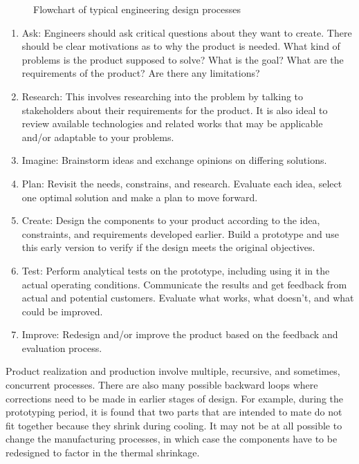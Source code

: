 \documentclass[
10pt,
a4paper,
openany,
svgnames,
]{book}
\begin{document}
\begin{figure}[h]
  \centering
  \caption{Flowchart of typical engineering design processes}
  \label{fig: engineering design processes}
\end{figure}

\begin{enumerate}
\item Ask: Engineers should ask critical questions about they want to create. There should be clear motivations as to why the product is needed. What kind of problems is the product supposed to solve? What is the goal? What are the requirements of the product? Are there any limitations?
\item Research: This involves researching into the problem by talking to stakeholders about their requirements for the product. It is also ideal to review available technologies and related works that may be applicable and/or adaptable to your problems.
\item Imagine: Brainstorm ideas and exchange opinions on differing solutions.
\item Plan: Revisit the needs, constrains, and research. Evaluate each idea, select one optimal solution and make a plan to move forward.
\item Create: Design the components to your product according to the idea, constraints, and requirements developed earlier. Build a prototype and use this early version to verify if the design meets the original objectives.
\item Test: Perform analytical tests on the prototype, including using it in the actual operating conditions. Communicate the results and get feedback from actual and potential customers. Evaluate what works, what doesn't, and what could be improved.
\item Improve: Redesign and/or improve the product based on the feedback and evaluation process.
\end{enumerate}

Product realization and production involve multiple, recursive, and sometimes, concurrent processes. There are also many possible backward loops where corrections need to be made in earlier stages of design. For example, during the prototyping period, it is found that two parts that are intended to mate do not fit together because they shrink during cooling. It may not be at all possible to change the manufacturing processes, in which case the components have to be redesigned to factor in the thermal shrinkage.
\end{document}
